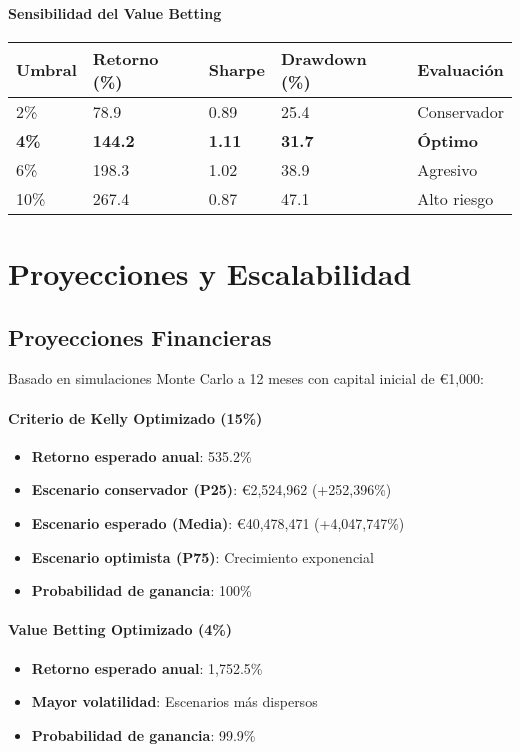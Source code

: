 \documentclass{article}
\begin{document}
\paragraph{Sensibilidad del Value Betting}
\begin{longtable}{|p{2.5cm}|p{2cm}|p{2cm}|p{2cm}|p{2.5cm}|}
\hline
\textbf{Umbral} & \textbf{Retorno (\%)} & \textbf{Sharpe} & \textbf{Drawdown (\%)} & \textbf{Evaluación} \\
\hline
\endhead
2\% & 78.9 & 0.89 & 25.4 & Conservador \\
\hline
\textcolor{primary}{\textbf{4\%}} & \textcolor{primary}{\textbf{144.2}} & \textcolor{primary}{\textbf{1.11}} & \textcolor{primary}{\textbf{31.7}} & \textcolor{primary}{\textbf{Óptimo}} \\
\hline
6\% & 198.3 & 1.02 & 38.9 & Agresivo \\
\hline
10\% & 267.4 & 0.87 & 47.1 & Alto riesgo \\
\hline
\end{longtable}

\section{Proyecciones y Escalabilidad}

\subsection{Proyecciones Financieras}

Basado en simulaciones Monte Carlo a 12 meses con capital inicial de €1,000:

\paragraph{Criterio de Kelly Optimizado (15\%)}
\begin{itemize}
    \item \textbf{Retorno esperado anual}: 535.2\%
    \item \textbf{Escenario conservador (P25)}: €2,524,962 (+252,396\%)
    \item \textbf{Escenario esperado (Media)}: €40,478,471 (+4,047,747\%)
    \item \textbf{Escenario optimista (P75)}: Crecimiento exponencial
    \item \textbf{Probabilidad de ganancia}: 100\%
\end{itemize}

\paragraph{Value Betting Optimizado (4\%)}
\begin{itemize}
    \item \textbf{Retorno esperado anual}: 1,752.5\%
    \item \textbf{Mayor volatilidad}: Escenarios más dispersos
    \item \textbf{Probabilidad de ganancia}: 99.9\%
\end{itemize}
\end{document}
